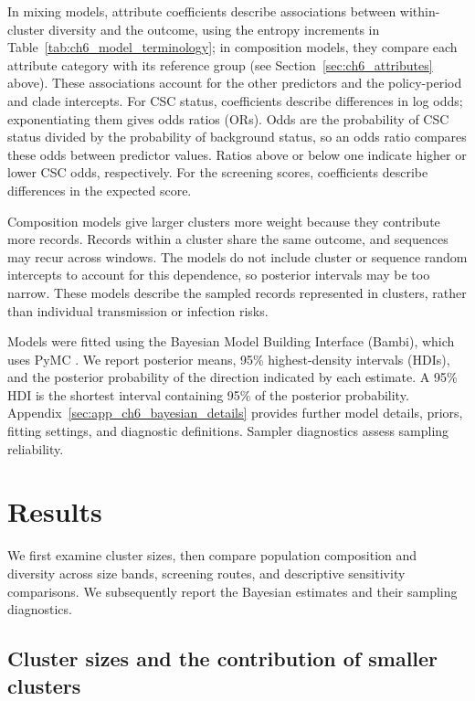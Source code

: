 In mixing models, attribute coefficients describe associations between within-cluster diversity and the outcome, using the entropy increments in Table~\ref{tab:ch6_model_terminology}; in composition models, they compare each attribute category with its reference group (see Section~\ref{sec:ch6_attributes} above). These associations account for the other predictors and the policy-period and clade intercepts. For CSC status, coefficients describe differences in log odds; exponentiating them gives odds ratios (ORs). Odds are the probability of CSC status divided by the probability of background status, so an odds ratio compares these odds between predictor values. Ratios above or below one indicate higher or lower CSC odds, respectively. For the screening scores, coefficients describe differences in the expected score.

Composition models give larger clusters more weight because they contribute more records. Records within a cluster share the same outcome, and sequences may recur across windows. The models do not include cluster or sequence random intercepts to account for this dependence, so posterior intervals may be too narrow. These models describe the sampled records represented in clusters, rather than individual transmission or infection risks.

Models were fitted using the Bayesian Model Building Interface (Bambi), which uses PyMC \citep{Capretto2022,AbrilPla2023}. We report posterior means, 95\% highest-density intervals (HDIs), and the posterior probability of the direction indicated by each estimate. A 95\% HDI is the shortest interval containing 95\% of the posterior probability. Appendix~\ref{sec:app_ch6_bayesian_details} provides further model details, priors, fitting settings, and diagnostic definitions. Sampler diagnostics assess sampling reliability.

\section{Results}\label{sec:ch6_results}

We first examine cluster sizes, then compare population composition and diversity across size bands, screening routes, and descriptive sensitivity comparisons. We subsequently report the Bayesian estimates and their sampling diagnostics.

\subsection{Cluster sizes and the contribution of smaller clusters}\label{sec:ch6_size_results}

